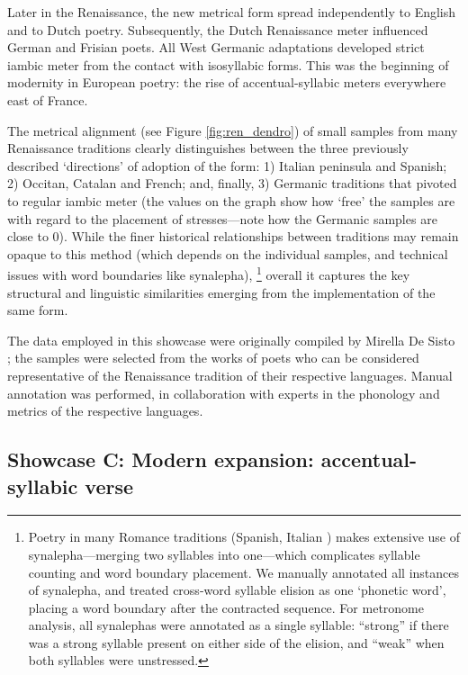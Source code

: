 \documentclass[
    hf
]{ceurart}
\begin{document}
Later in the Renaissance, the new metrical form spread independently to English and to Dutch poetry. Subsequently, the Dutch Renaissance meter influenced German and Frisian poets. All West Germanic adaptations developed strict iambic meter from the contact with isosyllabic forms. This was the beginning of modernity in European poetry: the rise of accentual-syllabic meters everywhere east of France.

The metrical alignment (see Figure \ref{fig:ren_dendro}) of small samples from many Renaissance traditions clearly distinguishes between the three previously described ‘directions’ of adoption of the form: 1) Italian peninsula and Spanish; 2) Occitan, Catalan and French; and, finally, 3) Germanic traditions that pivoted to regular iambic meter (the values on the graph show how ‘free’ the samples are with regard to the placement of stresses---note how the Germanic samples are close to 0). While the finer historical relationships between traditions may remain opaque to this method (which depends on the individual samples, and technical issues with word boundaries like synalepha),%
%
\footnote{
    Poetry in many Romance traditions (Spanish, Italian \textellipsis) makes extensive use of synalepha---merging two syllables into one---which complicates syllable counting and word boundary placement. We manually annotated all instances of synalepha, and treated cross-word syllable elision as one `phonetic word', placing a word boundary after the contracted sequence. For metronome analysis, all synalephas were annotated as a single syllable: ``strong'' if there was a strong syllable present on either side of the elision, and ``weak'' when both syllables were unstressed.
}
%    
overall it captures the key structural and linguistic similarities emerging from the implementation of the same form.

The data employed in this showcase were originally compiled by Mirella De Sisto \cite{de_sisto_interaction_2020}; the samples were selected from the works of poets who can be considered representative of the Renaissance tradition of their respective languages. Manual annotation was performed, in collaboration with experts in the phonology and metrics of the respective languages.

\subsection*{Showcase C: Modern expansion: accentual-syllabic verse}
\end{document}
